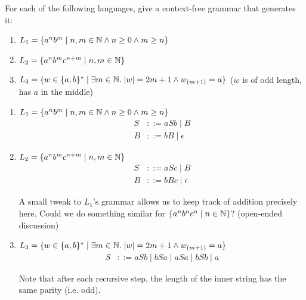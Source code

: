 
\begin{exercise}{}

  For each of the following languages, give a context-free grammar that
  generates it:

  \begin{enumerate}
    \item \(L_1 = \{a^nb^m \mid n, m \in \mathbb{N} \land n \geq 0 \land m \geq n\}\)
    \item \(L_2 = \{a^nb^mc^{n+m} \mid n, m \in \mathbb{N}\}\)
    \item \(L_3 = \{w \in \{a, b\}^* \mid \exists m \in \mathbb{N}.\; |w| = 2m +
    1 \land w_{(m+1)} = a \}\) (\(w\) is of odd length, has \(a\) in the middle)
  \end{enumerate}

  \begin{solution}
    \begin{enumerate}
      \item \(L_1 = \{a^nb^m \mid n, m \in \mathbb{N} \land n \geq 0 \land m \geq n\}\)
      \begin{align*}
        S &::= aSb \mid B\\
        B &::= bB \mid \epsilon
      \end{align*}
      \item \(L_2 = \{a^nb^mc^{n+m} \mid n, m \in \mathbb{N}\}\)
      \begin{align*}
        S &::= aSc \mid B\\
        B &::= bBc \mid \epsilon
      \end{align*}

      A small tweak to \(L_1\)'s grammar allows us to keep track of addition
      precisely here. Could we do something similar for \(\{a^nb^nc^n \mid n \in
      \mathbb{N}\}\)? (open-ended discussion)

      \item \(L_3 = \{w \in \{a, b\}^* \mid \exists m \in \mathbb{N}.\; |w| = 2m +
      1 \land w_{(m+1)} = a \}\)
      \begin{align*}
        S &::= aSb \mid bSa \mid aSa \mid bSb \mid a
      \end{align*}

      Note that after each recursive step, the length of the inner string has
      the same parity (i.e. odd).
    \end{enumerate}    
  \end{solution}
  
\end{exercise}

